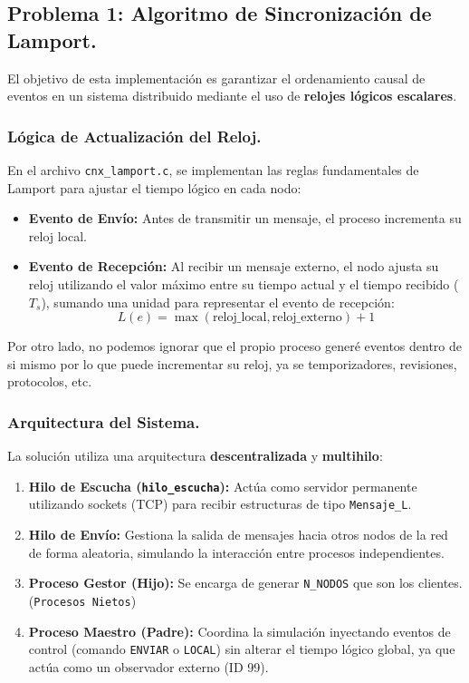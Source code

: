 \subsection{Problema 1: Algoritmo de Sincronización de Lamport.}

El objetivo de esta implementación es garantizar el ordenamiento causal de eventos en un sistema distribuido mediante el uso de \textbf{relojes lógicos escalares}.

\subsubsection{Lógica de Actualización del Reloj.}
En el archivo \texttt{cnx\_lamport.c}, se implementan las reglas fundamentales de Lamport para ajustar el tiempo lógico en cada nodo:

\begin{itemize}
    \item \textbf{Evento de Envío:} Antes de transmitir un mensaje, el proceso incrementa su reloj local.
    \item \textbf{Evento de Recepción:} Al recibir un mensaje externo, el nodo ajusta su reloj utilizando el valor máximo entre su tiempo actual y el tiempo recibido ($T_s$), sumando una unidad para representar el evento de recepción:
    \[ L(e) = \max(\text{reloj\_local}, \text{reloj\_externo}) + 1 \]
\end{itemize}

Por otro lado, no podemos ignorar que el propio proceso generé eventos dentro de si mismo por lo que puede incrementar su reloj, ya se temporizadores, revisiones, protocolos, etc.

\subsubsection{Arquitectura del Sistema.}
La solución utiliza una arquitectura \textbf{descentralizada} y \textbf{multihilo}:
\begin{enumerate}
    \item \textbf{Hilo de Escucha (\texttt{hilo\_escucha}):} Actúa como servidor permanente utilizando sockets (TCP) para recibir estructuras de tipo \texttt{Mensaje\_L}.
    \item \textbf{Hilo de Envío:} Gestiona la salida de mensajes hacia otros nodos de la red de forma aleatoria, simulando la interacción entre procesos independientes.
    \item \textbf{Proceso Gestor (Hijo):} Se encarga de generar \texttt{N\_NODOS} que son los clientes. (\texttt{Procesos Nietos})
    \item \textbf{Proceso Maestro (Padre):} Coordina la simulación inyectando eventos de control (comando \texttt{ENVIAR} o \texttt{LOCAL}) sin alterar el tiempo lógico global, ya que actúa como un observador externo (ID 99).
\end{enumerate}

